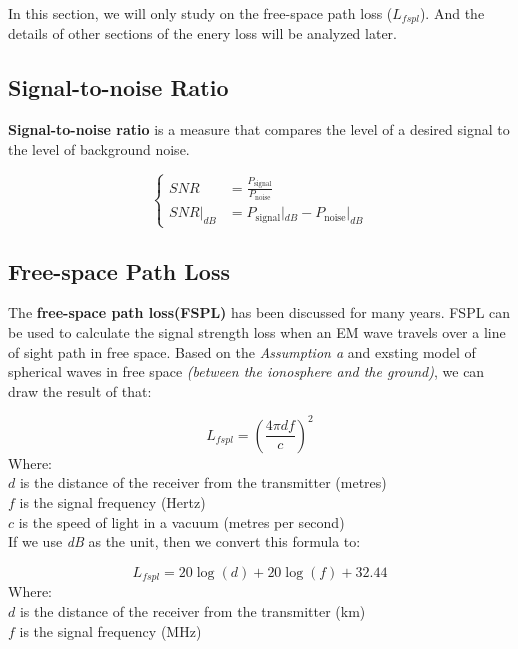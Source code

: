 \documentclass{mcmthesis}
\begin{document}
     In this section, we will only study on the free-space path loss ($L_{fspl}$). And the details of other sections of the enery loss will be analyzed later.

  \subsection{Signal-to-noise Ratio}
     \textbf{Signal-to-noise ratio} is a measure that compares the level of a desired signal to the level of background noise.

     \begin{equation}\label{eq:SNR}
     \left\{
     \begin{aligned}
         SNR &= \frac{P_{\text{signal}}}{P_\text{noise}} \\
         SNR|_{dB} &= P_{\text{signal}}|_{dB} - P_{\text{noise}}|_{dB}
     \end{aligned}
     \right.
     \end{equation}

  \subsection{Free-space Path Loss}
      The \textbf{free-space path loss(FSPL)}\cite{freespacepathloss} has been discussed for many years. FSPL can be used to calculate the signal strength loss when an EM wave travels over a line of sight path in free space. Based on the \emph{Assumption a} and exsting model of spherical waves in free space \emph{(between the ionosphere and the ground)}, we can draw the result of that:

        \begin{equation}\label{eq:FSPL_old}
          L_{fspl} = (\frac{4 \pi d f}{c})^{2}
        \end{equation}
        Where: \\
        $d$ is the distance of the receiver from the transmitter (metres)\\
        $f$ is the signal frequency (Hertz)\\
        $c$ is the speed of light in a vacuum (metres per second)\\

      If we use \emph{dB} as the unit, then we convert this formula to:

        \begin{equation}\label{eq:FSPL_applied}
          L_{fspl} = 20\log(d) + 20\log(f) + 32.44
        \end{equation}
        Where:\\
        $d$ is the distance of the receiver from the transmitter (km)\\
        $f$ is the signal frequency (MHz)\\
\end{document}
